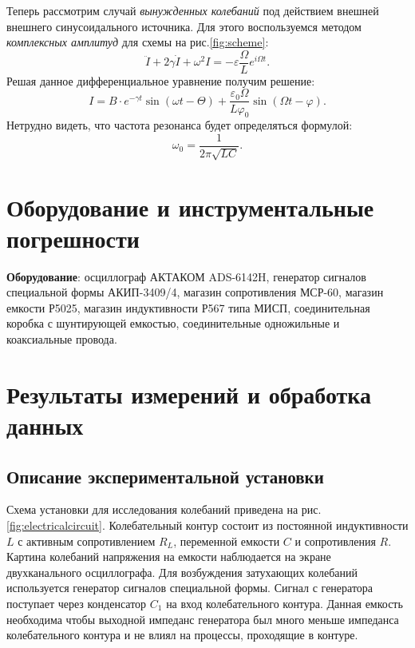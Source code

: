 \documentclass[
a4paper, %
12pt, %
]{article}
\renewcommand {\phi}{\varphi}
\begin{document}
	Теперь рассмотрим случай \textit{вынужденных колебаний} под действием внешней внешнего синусоидального источника. Для этого воспользуемся методом \textit{комплексных амплитуд} для схемы на рис.\ref{fig:scheme}:
	\begin{equation}
		\ddot{I} + 2 \gamma \dot{I} + \omega^2 I = - \varepsilon \frac{\Omega}{L} e^{i\Omega t}.
	\end{equation}
	Решая данное дифференциальное уравнение получим решение:
	\begin{equation}
		I = B\cdot e^{-\gamma t} \sin{(\omega t - \Theta)} + \frac{\varepsilon_0 \Omega}{L \phi_0} \sin{(\Omega t - \varphi)}.
	\end{equation}
	Нетрудно видеть, что частота резонанса будет определяться формулой:
	\begin{equation}
		\omega_0 = \frac{1}{2 \pi \sqrt{LC}}.
	\end{equation}
	
	
	\newpage
	
	\section{Оборудование и инструментальные погрешности}
	
	\textbf{Оборудование}: осциллограф АКТАКОМ ADS-6142H, генератор сигналов специальной формы АКИП-3409/4, магазин сопротивления МСР-60, магазин емкости Р5025, магазин индуктивности Р567 типа
	МИСП, соединительная коробка с шунтирующей емкостью, соединительные одножильные и коаксиальные провода.
	
	\section{Результаты измерений и обработка данных}
	
	\subsection{Описание экспериментальной установки}
	Схема установки для исследования колебаний приведена на рис.\ref{fig:electricalcircuit}.
	Колебательный контур состоит из постоянной индуктивности $L$ с активным сопротивлением $R_L$, переменной емкости $C$ и сопротивления $R$. Картина колебаний напряжения на емкости наблюдается на экране двухканального осциллографа. Для возбуждения затухающих колебаний используется генератор сигналов специальной
	формы. Сигнал с генератора поступает через конденсатор $C_1$ на вход колебательного контура. Данная емкость необходима чтобы выходной импеданс генератора был много меньше импеданса колебательного контура и не влиял на процессы, проходящие в контуре.
	
\end{document}
